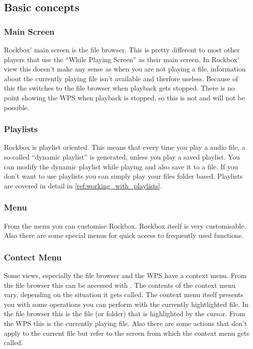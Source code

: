 \subsection{Basic concepts}
\subsubsection{Main Screen}
Rockbox' main screen is the file browser. This is pretty different to most
other players that use the ``While Playing Screen'' as their main screen.
In Rockbox' view this doesn't make any sense as when you are not playing a
file, information about the currently playing file isn't available and therfore
useless. Because of this the \dap{} switches to the file browser when
playback gets stopped. There is no point showing the WPS when playback is
stopped, so this is not and will not be possible.

\subsubsection{Playlists}
Rockbox is playlist oriented. This means that every time you play a audio file,
a so-called ``dynamic playlist'' is generated,  unless you play a saved
playlist. You can modify the dynamic playlist while playing and also save
it to a file. If you don't want to use playlists you can simply play your
files folder based.
Playlists are covered in detail in \ref{ref:working_with_playlists}.

\subsubsection{Menu}
From the menu you can customise Rockbox. Rockbox itself is very customisable.
Also there are some special menus for quick access to frequently used
functions.

\subsubsection{Contect Menu}
Some views, especially the file browser and the WPS have a context menu.
From the file browser this can be accessed with \ActionStdContext{}.
The contents of the context menu vary, depending on the situation it gets
called. The context menu itself presents you with some operations you can
perform with the currently hightlighted file. In the file browser this is
the file (or folder) that is highlighted by the cursor. From the WPS this is
the currently playing file. Also there are some actions that don't apply
to the current file but refer to the screen from which the context menu
gets called.

